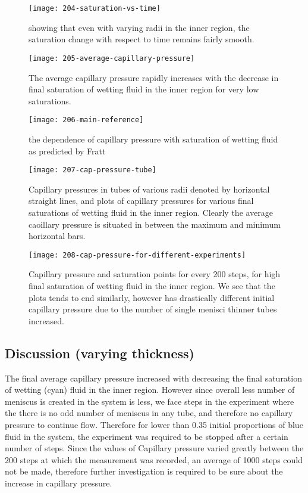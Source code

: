 	\begin{figure}[H]
		\centering
		\texttt{[image: 204-saturation-vs-time]}
		\caption{showing that even with varying radii in the inner region, the saturation change with respect to time remains fairly smooth.}
		\label{fig:204-saturation-vs-time}
	\end{figure}
	
	\begin{figure}[H]
		\centering
		\texttt{[image: 205-average-capillary-pressure]}
		\caption{The average capillary pressure rapidly increases with the decrease in final saturation of wetting fluid in the inner region for very low saturations.}
		\label{fig:205-average-capillary-pressure}
	\end{figure}
	
	\begin{figure}[H]
		\centering
		\texttt{[image: 206-main-reference]}
		\caption{the dependence of capillary pressure with saturation of wetting fluid as predicted by Fratt \cite{fatt1956network}}
		\label{fig:206-main-reference}
	\end{figure}

	\begin{figure}[H]
		\centering
		\texttt{[image: 207-cap-pressure-tube]}
		\caption{Capillary pressures in tubes of various radii denoted by horizontal straight lines, and plots of capillary pressures for various final saturations of wetting fluid in the inner region. Clearly the average caoillary pressure is situated in between the maximum and minimum horizontal bars.}
		\label{fig:207-cap-pressure-tube}
	\end{figure}
	
	\begin{figure}[H]
		\centering
		\texttt{[image: 208-cap-pressure-for-different-experiments]}
		\caption{Capillary pressure and saturation points for every 200 steps, for high final saturation of wetting fluid in the inner region. We see that the plots tends to end similarly, however has drastically different initial capillary pressure due to the number of single menisci thinner tubes increased.}
		\label{fig:208-cap-pressure-for-different-experiments}
	\end{figure}

\subsection{Discussion (varying thickness)}
	The final average capillary pressure increased with decreasing the final saturation of wetting (cyan) fluid in the inner region. However since overall less number of meniscus is created in the system is less, we face steps in the experiment where the there is no odd number of meniscus in any tube, and therefore no capillary pressure to continue flow. Therefore for lower than 0.35 initial proportions of blue fluid in the system, the experiment was required to be stopped after a certain number of steps. Since the values of Capillary pressure varied greatly between the 200 steps at which the measurement was recorded, an average of 1000 steps could not be made, therefore further investigation is required to be sure about the increase in capillary pressure.
